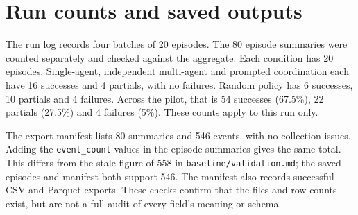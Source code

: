 \documentclass[12pt,a4paper,oneside]{report}
\begin{document}
\section{Run counts and saved outputs}
The run log records four batches of 20 episodes. The 80 episode summaries were counted separately and checked against the aggregate. Each condition has 20 episodes. Single-agent, independent multi-agent and prompted coordination each have 16 successes and 4 partials, with no failures. Random policy has 6 successes, 10 partials and 4 failures. Across the pilot, that is 54 successes (67.5\%), 22 partials (27.5\%) and 4 failures (5\%). These counts apply to this run only.

The export manifest lists 80 summaries and 546 events, with no collection issues. Adding the \texttt{event\allowbreak\_count} values in the episode summaries gives the same total. This differs from the stale figure of 558 in \texttt{baseline/validation.md}; the saved episodes and manifest both support 546. The manifest also records successful CSV and Parquet exports. These checks confirm that the files and row counts exist, but are not a full audit of every field’s meaning or schema.
\end{document}

